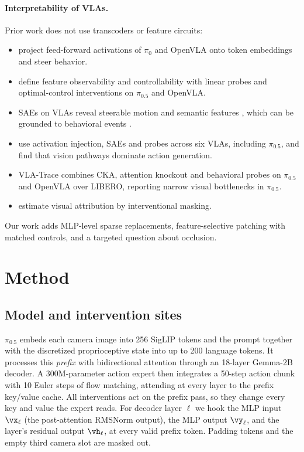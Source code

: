 \documentclass{article} %
\newcommand{\pifive}{$\pi_{0.5}$}
\begin{document}
\paragraph{Interpretability of VLAs.} Prior work does not use transcoders or feature circuits:
\begin{itemize}[leftmargin=*,itemsep=0pt,topsep=1pt]
  \item \citet{haon2025mechanistic} project feed-forward activations of $\pi_0$ and OpenVLA onto token embeddings and steer behavior.
  \item \citet{buurmeijer2026observing} define feature observability and controllability with linear probes and optimal-control interventions on \pifive{} and OpenVLA.
  \item SAEs on VLAs reveal steerable motion and semantic features \citep{swann2026sparse}, which can be grounded to behavioral events \citep{jin2026event}.
  \item \citet{grant2026features} use activation injection, SAEs and probes across six VLAs, including \pifive{}, and find that vision pathways dominate action generation.
  \item VLA-Trace \citep{shi2026vlatrace} combines CKA, attention knockout and behavioral probes on \pifive{} and OpenVLA over LIBERO, reporting narrow visual bottlenecks in \pifive{}.
  \item \citet{zhang2026embodied} estimate visual attribution by interventional masking.
\end{itemize}
Our work adds MLP-level sparse replacements, feature-selective patching with matched controls, and a targeted question about occlusion.

\section{Method}
\label{sec:method}

\subsection{Model and intervention sites}
\pifive{} embeds each camera image into 256 SigLIP tokens and the prompt together with the discretized proprioceptive state into up to 200 language tokens. It processes this \emph{prefix} with bidirectional attention through an 18-layer Gemma-2B decoder. A 300M-parameter action expert then integrates a 50-step action chunk with 10 Euler steps of flow matching, attending at every layer to the prefix key/value cache. All interventions act on the prefix pass, so they change every key and value the expert reads. For decoder layer $\ell$ we hook the MLP input $\vx_\ell$ (the post-attention RMSNorm output), the MLP output $\vy_\ell$, and the layer's residual output $\vh_\ell$, at every valid prefix token. Padding tokens and the empty third camera slot are masked out.
\end{document}
